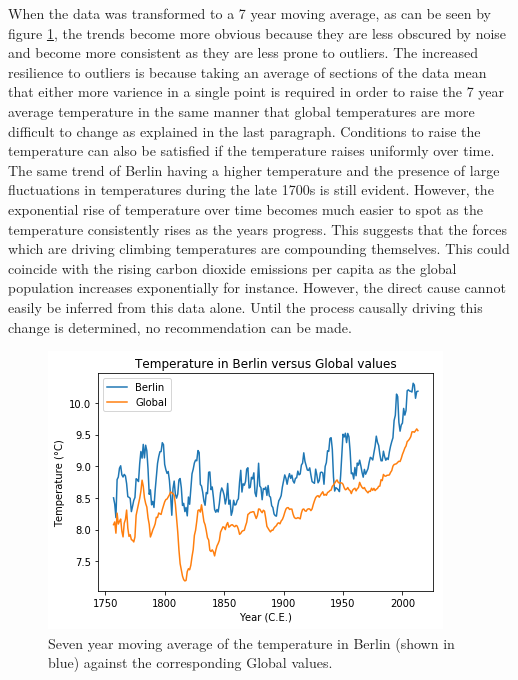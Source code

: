 \documentclass[journal, a4paper]{IEEEtran}
\begin{document}
    When the data was transformed to a 7 year moving average, as can be seen by figure \ref{fig2},  the trends become more obvious because they are less obscured by noise and become more consistent as they are less prone to outliers. The increased resilience to outliers is because taking an average of sections of the data mean that either more varience in a single point is required in order to raise the 7 year average temperature in the same manner that global temperatures are more difficult to change as explained in the last paragraph. Conditions to raise the temperature can also be satisfied if the temperature raises uniformly over time.\\
    
    The same trend of Berlin having a higher temperature and the presence of large fluctuations in temperatures during the late 1700s is still evident. However, the exponential rise of temperature over time becomes much easier to spot as the temperature consistently rises as the years progress. This suggests that the forces which are driving climbing temperatures are compounding themselves. This could coincide with the rising carbon dioxide emissions per capita as the global population increases exponentially for instance. However, the direct cause cannot easily be inferred from this data alone. Until the process causally driving this change is determined, no recommendation can be made.\\

	\begin{figure}[!hbt]
		\begin{center}
		\includegraphics[width=\columnwidth]{7DayMovingAverageTemperaturePlot.png}
		\caption{Seven year moving average of the temperature in Berlin (shown in blue) against the corresponding Global values.}
		\label{fig2}
		\end{center}
	\end{figure}
    
\end{document}
